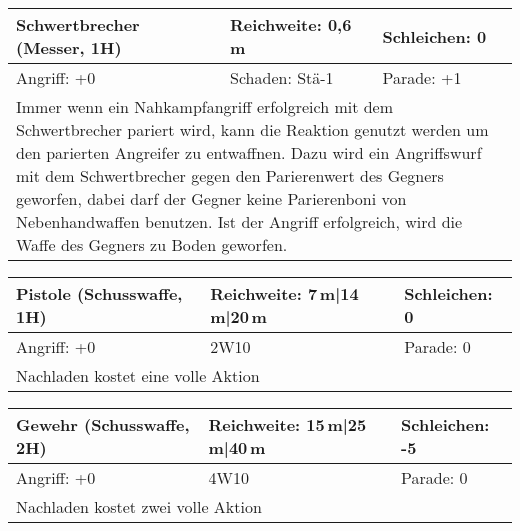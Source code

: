 \documentclass[../../Heldenanleitung2]{subfiles}
\begin{document}
\newline \newline\newline
\begin{tabular}{|p{}|p{}|p{}|}
\hline
\textbf{Schwertbrecher (Messer, 1H)} & Reichweite: 0,6\,m & Schleichen: 0 \\
\hline
Angriff: +0 & Schaden: Stä-1 & Parade: +1\\
\hline
\multicolumn{3}{|p{0.99\textwidth}|}{
Immer wenn ein Nahkampfangriff erfolgreich mit dem Schwertbrecher pariert wird, kann die Reaktion genutzt werden um den parierten Angreifer zu entwaffnen. Dazu wird ein Angriffswurf mit dem Schwertbrecher gegen den Parierenwert des Gegners geworfen, dabei darf der Gegner keine Parierenboni von Nebenhandwaffen benutzen. Ist der Angriff erfolgreich, wird die Waffe des Gegners zu Boden geworfen.
} \\
\hline
\end{tabular}
\newline \newline\newline
\begin{tabular}{|p{}|p{}|p{}|}
	\hline
	\textbf{Pistole (Schusswaffe, 1H)} & Reichweite: 7\,m|14\,m|20\,m & Schleichen: 0 \\
	\hline
	Angriff: +0 & 2W10 & Parade: 0\\
	\hline
	\multicolumn{3}{|p{0.99\textwidth}|}{
		Nachladen kostet eine volle Aktion
	} \\
	\hline
\end{tabular}
\newline \newline\newline
\begin{tabular}{|p{}|p{}|p{}|}
	\hline
	\textbf{Gewehr (Schusswaffe, 2H)} & Reichweite: 15\,m|25\,m|40\,m & Schleichen: -5 \\
	\hline
	Angriff: +0 & 4W10 & Parade: 0\\
	\hline
	\multicolumn{3}{|p{0.99\textwidth}|}{
		Nachladen kostet zwei volle Aktion
	} \\
	\hline
\end{tabular}
\end{document}
